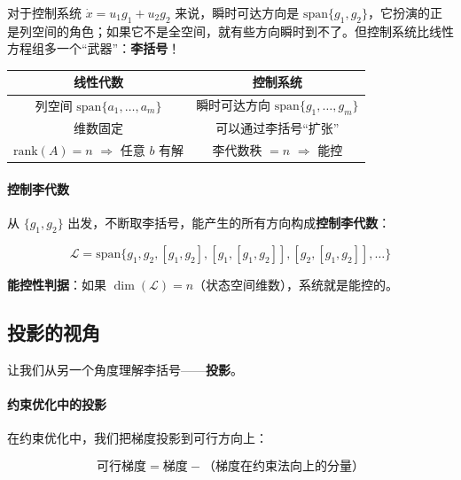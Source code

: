 对于控制系统 $\dot{x} = u_1 g_1 + u_2 g_2$ 来说，瞬时可达方向是 $\text{span}\{g_1, g_2\}$，它扮演的正是列空间的角色；如果它不是全空间，就有些方向瞬时到不了。但控制系统比线性方程组多一个“武器”：\textbf{李括号}！

\begin{center}
\renewcommand{\arraystretch}{1.3}
\begin{tabular}{c|c}
\toprule
\textbf{线性代数} & \textbf{控制系统} \\
\midrule
列空间 $\text{span}\{a_1, \ldots, a_m\}$ & 瞬时可达方向 $\text{span}\{g_1, \ldots, g_m\}$ \\
维数固定 & 可以通过李括号“扩张” \\
$\text{rank}(A) = n$ $\Rightarrow$ 任意 $b$ 有解 & 李代数秩 $= n$ $\Rightarrow$ 能控 \\
\bottomrule
\end{tabular}
\end{center}

\paragraph{控制李代数}

从 $\{g_1, g_2\}$ 出发，不断取李括号，能产生的所有方向构成\textbf{控制李代数}：

\begin{equation}
\mathcal{L} = \text{span}\{g_1, g_2, [g_1, g_2], [g_1, [g_1, g_2]], [g_2, [g_1, g_2]], \ldots\}
\end{equation}

\textbf{能控性判据}：如果 $\dim(\mathcal{L}) = n$（状态空间维数），系统就是能控的。

\subsection*{投影的视角}

让我们从另一个角度理解李括号——\textbf{投影}。

\paragraph{约束优化中的投影}

在约束优化中，我们把梯度投影到可行方向上：

\begin{equation}
\text{可行梯度} = \text{梯度} - \text{（梯度在约束法向上的分量）}
\end{equation}

